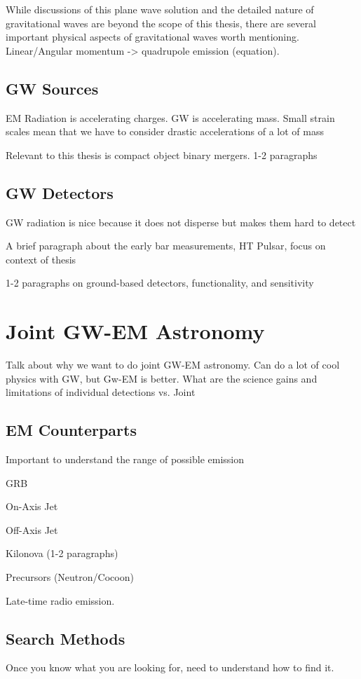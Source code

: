 While discussions of this plane wave solution and the detailed nature of gravitational waves are beyond the scope of this thesis, there are several important physical aspects of gravitational waves worth mentioning. Linear/Angular momentum -> quadrupole emission (equation). 

\subsection{GW Sources}
\label{sec:intro_gw_source}
EM Radiation is accelerating charges. GW is accelerating mass. Small strain scales mean that we have to consider drastic accelerations of a lot of mass

Relevant to this thesis is compact object binary mergers. 1-2 paragraphs

\subsection{GW Detectors}
\label{sec:intro_gw_det}
GW radiation is nice because it does not disperse but makes them hard to detect

A brief paragraph about the early bar measurements, HT Pulsar, focus on context of thesis

1-2 paragraphs on ground-based detectors, functionality, and sensitivity 

\section{Joint GW-EM Astronomy}
\label{sec:intro_joint}
Talk about why we want to do joint GW-EM astronomy. Can do a lot of cool physics with GW, but Gw-EM is better. What are the science gains and limitations of individual detections vs. Joint

\subsection{EM Counterparts}
\label{sec:intro_counterparts}
Important to understand the range of possible emission

GRB

On-Axis Jet

Off-Axis Jet

Kilonova (1-2 paragraphs)

Precursors (Neutron/Cocoon)

Late-time radio emission.

\subsection{Search Methods}
\label{sec:intro_searchmethods}
Once you know what you are looking for, need to understand how to find it. 


